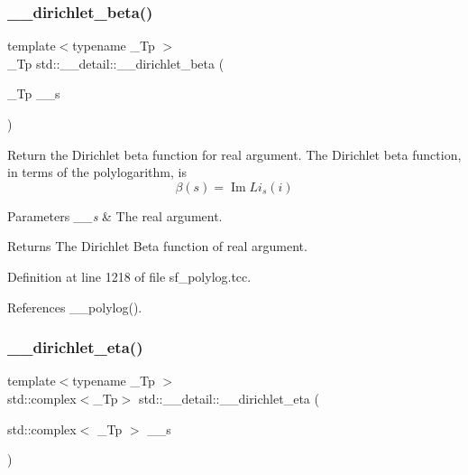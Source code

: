 \mbox{\label{namespacestd_1_1____detail_a2e4243f8d092d48e16fc45ba0c4e9489}} 
\subsubsection{\texorpdfstring{\+\_\+\+\_\+dirichlet\+\_\+beta()}{\_\_dirichlet\_beta()}\hspace{0.1cm}{\footnotesize\ttfamily [2/2]}}
{\footnotesize\ttfamily template$<$typename \+\_\+\+Tp $>$ \\
\+\_\+\+Tp std\+::\+\_\+\+\_\+detail\+::\+\_\+\+\_\+dirichlet\+\_\+beta (\begin{DoxyParamCaption}\item[{\+\_\+\+Tp}]{\+\_\+\+\_\+s }\end{DoxyParamCaption})}

Return the Dirichlet beta function for real argument. The Dirichlet beta function, in terms of the polylogarithm, is \[ \renewcommand\Re{\operatorname{Re}} \renewcommand\Im{\operatorname{Im}} \beta(s) = \Im{Li_s(i)} \]


\begin{DoxyParams}{Parameters}
{\em \+\_\+\+\_\+s} & The real argument. \\
\hline
\end{DoxyParams}
\begin{DoxyReturn}{Returns}
The Dirichlet Beta function of real argument. 
\end{DoxyReturn}


Definition at line 1218 of file sf\+\_\+polylog.\+tcc.



References \+\_\+\+\_\+polylog().

\mbox{\label{namespacestd_1_1____detail_a3d8d694bf430ca3959c9e6b00c332468}} 
\subsubsection{\texorpdfstring{\+\_\+\+\_\+dirichlet\+\_\+eta()}{\_\_dirichlet\_eta()}\hspace{0.1cm}{\footnotesize\ttfamily [1/2]}}
{\footnotesize\ttfamily template$<$typename \+\_\+\+Tp $>$ \\
std\+::complex$<$\+\_\+\+Tp$>$ std\+::\+\_\+\+\_\+detail\+::\+\_\+\+\_\+dirichlet\+\_\+eta (\begin{DoxyParamCaption}\item[{std\+::complex$<$ \+\_\+\+Tp $>$}]{\+\_\+\+\_\+s }\end{DoxyParamCaption})}

